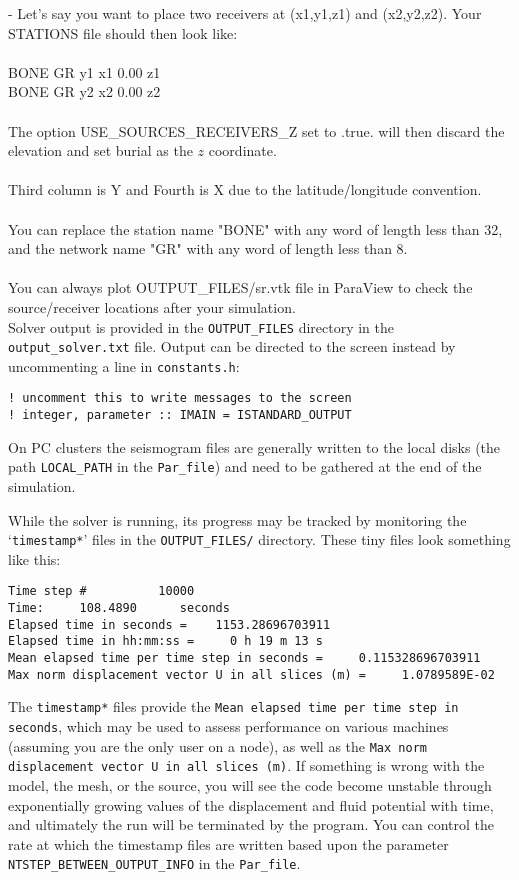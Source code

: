 - Let's say you want to place two receivers at (x1,y1,z1) and
(x2,y2,z2). Your STATIONS file should then look like:\\
\\
BONE  GR  y1  x1  0.00  z1\\
BONE  GR  y2  x2  0.00  z2\\
\\
The option USE\_SOURCES\_RECEIVERS\_Z set to .true. will then discard the elevation and set
burial as the $z$ coordinate.\\
\\
Third column is Y and Fourth is X due to the latitude/longitude convention.\\
\\
You can replace the station name "BONE" with any word of length less
than 32, and the network name "GR" with any word of length less than
8.\\
\\
You can always plot OUTPUT\_FILES/sr.vtk file in ParaView to check the
source/receiver locations after your simulation.\\

Solver output is provided in the \texttt{OUTPUT\_FILES} directory
in the \texttt{output\_solver.txt} file. Output can be directed to
the screen instead by uncommenting a line in \texttt{constants.h}:
\begin{verbatim}
! uncomment this to write messages to the screen
! integer, parameter :: IMAIN = ISTANDARD_OUTPUT
\end{verbatim}
On PC clusters the seismogram files are generally written to the local
disks (the path \texttt{LOCAL\_PATH} in the \texttt{Par\_file}) and
need to be gathered at the end of the simulation.

While the solver is running, its progress may be tracked by monitoring
the `\texttt{\small timestamp{*}}' files in the \texttt{\small OUTPUT\_FILES/} directory. These tiny
files look something like this:
{\small
\begin{verbatim}
Time step #          10000
Time:     108.4890      seconds
Elapsed time in seconds =    1153.28696703911
Elapsed time in hh:mm:ss =     0 h 19 m 13 s
Mean elapsed time per time step in seconds =     0.115328696703911
Max norm displacement vector U in all slices (m) =     1.0789589E-02
\end{verbatim}
}
The \texttt{\small timestamp{*}} files provide the
\texttt{\small Mean elapsed time per time step in seconds}, which may be used
to assess performance on various machines (assuming you are the only
user on a node), as well as the
\texttt{\small Max norm displacement vector U in all slices~(m)}.
If something is wrong with the
model, the mesh, or the source, you will see the code become unstable
through exponentially growing values of the displacement and fluid
potential with time, and ultimately the run will be terminated by
the program. You can control the rate at which the timestamp files
are written based upon the parameter
\texttt{\small NTSTEP\_BETWEEN\_OUTPUT\_INFO}
in the \texttt{\small Par\_file}.

